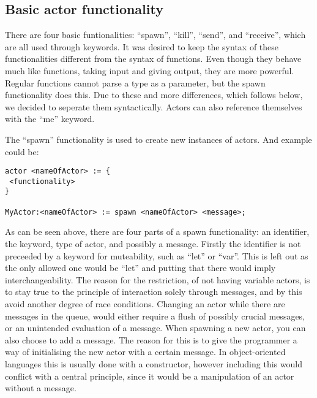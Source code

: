 \subsection{Basic actor functionality}

There are four basic funtionalities: \enquote{spawn}, \enquote{kill}, \enquote{send}, and \enquote{receive}, which are all used through keywords. It was desired to keep the syntax of these functionalities different from the syntax of functions. Even though they behave much like functions, taking input and giving output, they are more powerful. Regular functions cannot parse a type as a parameter, but the spawn functionality does this. Due to these and more differences, which follows below, we decided to seperate them syntactically. Actors can also reference themselves with the \enquote{me} keyword.

The \enquote{spawn} functionality is used to create new instances of actors. And example could be:

\label{actorfuncSpawn}
\begin{lstlisting}
actor <nameOfActor> := {
 <functionality>
}

MyActor:<nameOfActor> := spawn <nameOfActor> <message>;
\end{lstlisting}

As can be seen above, there are four parts of a spawn functionality: an identifier, the keyword, type of actor, and possibly a message. Firstly the identifier is not preceeded by a keyword for muteability, such as \enquote{let} or \enquote{var}. This is left out as the only allowed one would be \enquote{let} and putting that there would imply interchangeability. The reason for the restriction, of not having variable actors, is to stay true to the principle of interaction solely through messages, and by this avoid another degree of race conditions. Changing an actor while there are messages in the queue, would either require a flush of possibly crucial messages, or an unintended evaluation of a message. When spawning a new actor, you can also choose to add a message. The reason for this is to give the programmer a way of initialising the new actor with a certain message. In object-oriented languages this is usually done with a constructor, however including this would conflict with a central principle, since it would be a manipulation of an actor without a message.




